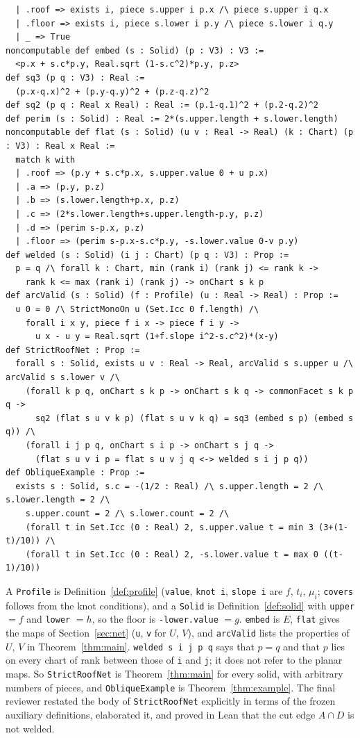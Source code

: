 \documentclass[11pt]{article}
\theoremstyle{definition}
\theoremstyle{remark}
\begin{document}
{\begin{verbatim}
  | .roof => exists i, piece s.upper i p.x /\ piece s.upper i q.x
  | .floor => exists i, piece s.lower i p.y /\ piece s.lower i q.y
  | _ => True
noncomputable def embed (s : Solid) (p : V3) : V3 :=
  <p.x + s.c*p.y, Real.sqrt (1-s.c^2)*p.y, p.z>
def sq3 (p q : V3) : Real :=
  (p.x-q.x)^2 + (p.y-q.y)^2 + (p.z-q.z)^2
def sq2 (p q : Real x Real) : Real := (p.1-q.1)^2 + (p.2-q.2)^2
def perim (s : Solid) : Real := 2*(s.upper.length + s.lower.length)
noncomputable def flat (s : Solid) (u v : Real -> Real) (k : Chart) (p : V3) : Real x Real :=
  match k with
  | .roof => (p.y + s.c*p.x, s.upper.value 0 + u p.x)
  | .a => (p.y, p.z)
  | .b => (s.lower.length+p.x, p.z)
  | .c => (2*s.lower.length+s.upper.length-p.y, p.z)
  | .d => (perim s-p.x, p.z)
  | .floor => (perim s-p.x-s.c*p.y, -s.lower.value 0-v p.y)
def welded (s : Solid) (i j : Chart) (p q : V3) : Prop :=
  p = q /\ forall k : Chart, min (rank i) (rank j) <= rank k ->
    rank k <= max (rank i) (rank j) -> onChart s k p
def arcValid (s : Solid) (f : Profile) (u : Real -> Real) : Prop :=
  u 0 = 0 /\ StrictMonoOn u (Set.Icc 0 f.length) /\
    forall i x y, piece f i x -> piece f i y ->
      u x - u y = Real.sqrt (1+f.slope i^2-s.c^2)*(x-y)
def StrictRoofNet : Prop :=
  forall s : Solid, exists u v : Real -> Real, arcValid s s.upper u /\ arcValid s s.lower v /\
    (forall k p q, onChart s k p -> onChart s k q -> commonFacet s k p q ->
      sq2 (flat s u v k p) (flat s u v k q) = sq3 (embed s p) (embed s q)) /\
    (forall i j p q, onChart s i p -> onChart s j q ->
      (flat s u v i p = flat s u v j q <-> welded s i j p q))
def ObliqueExample : Prop :=
  exists s : Solid, s.c = -(1/2 : Real) /\ s.upper.length = 2 /\ s.lower.length = 2 /\
    s.upper.count = 2 /\ s.lower.count = 2 /\
    (forall t in Set.Icc (0 : Real) 2, s.upper.value t = min 3 (3+(1-t)/10)) /\
    (forall t in Set.Icc (0 : Real) 2, -s.lower.value t = max 0 ((t-1)/10))
\end{verbatim}}
\noindent A \texttt{Profile} is Definition~\ref{def:profile}
(\texttt{value}, \texttt{knot i}, \texttt{slope i} are $f$, $t_i$, $\mu_i$;
\texttt{covers} follows from the knot conditions), and a \texttt{Solid} is
Definition~\ref{def:solid} with \texttt{upper} $=f$ and \texttt{lower} $=h$,
so the floor is \texttt{-lower.value} $=g$. \texttt{embed} is $E$,
\texttt{flat} gives the maps of Section~\ref{sec:net} (\texttt{u}, \texttt{v}
for $U$, $V$), and \texttt{arcValid} lists the properties of $U$, $V$ in
Theorem~\ref{thm:main}. \texttt{welded s i j p q} says that $p=q$ and that $p$
lies on every chart of rank between those of \texttt{i} and \texttt{j}; it
does not refer to the planar maps. So \texttt{StrictRoofNet} is
Theorem~\ref{thm:main} for every solid, with arbitrary numbers of pieces, and
\texttt{ObliqueExample} is Theorem~\ref{thm:example}. The final reviewer
restated the body of \texttt{StrictRoofNet} explicitly in terms of the frozen
auxiliary definitions, elaborated it, and proved in Lean that the cut edge
$A\cap D$ is not welded.
\end{document}
